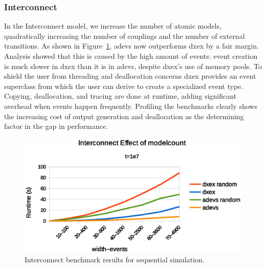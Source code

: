 \subsubsection{Interconnect}
\label{4-seq-Interconnect}
In the Interconnect model, we increase the number of atomic models, quadratically increasing the number of couplings and the number of external transitions.
As shown in Figure~\ref{fig:Interconnect_benchmark}, adevs now outperforms dxex by a fair margin.
Analysis showed that this is caused by the high amount of events: event creation is much slower in dxex than it is in adevs, despite dxex's use of memory pools.
To shield the user from threading and deallocation concerns dxex provides an event superclass from which the user can derive to create a specialized event type.
Copying, deallocation, and tracing are done at runtime, adding significant overhead when events happen frequently.
Profiling the benchmarks clearly shows the increasing cost of output generation and deallocation as the determining factor in the gap in performance.

\begin{figure}
	\center
	\includegraphics[width=\columnwidth]{fig/interconnect_sequential.eps}
	\caption{Interconnect benchmark results for sequential simulation.}
	\label{fig:Interconnect_benchmark}
\end{figure}

